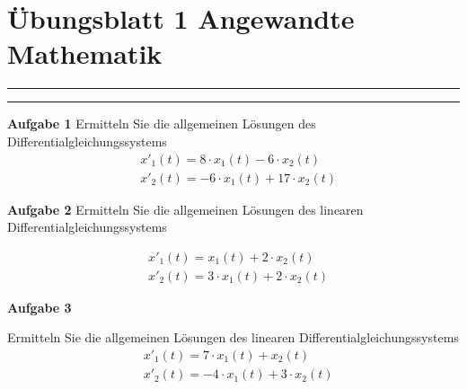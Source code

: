 \documentclass[a4paper,13pt]{scrartcl}
\begin{document}
\section*{\large  Übungsblatt 1 \hfill Angewandte Mathematik }
\hrule
\hrule
\vspace{4mm}

{\bf Aufgabe 1}
Ermitteln Sie die allgemeinen Lösungen  des  Differentialgleichungssystems
\begin{align*}
& x'_1(t) = 8 \cdot x_1(t) -6 \cdot x_2(t) \\
& x'_2(t) = -6 \cdot x_1(t) +17 \cdot x_2(t)
\end{align*}
\vspace{8mm}


{\bf Aufgabe 2}
Ermitteln Sie die allgemeinen Lösungen des linearen Differentialgleichungssystems

\begin{align*}
& x'_1(t) =  x_1(t) + 2 \cdot x_2(t) \\
& x'_2(t) =  3 \cdot x_1(t) +  2 \cdot x_2(t)
\end{align*}
\vspace{8mm}

\vspace{8mm}

{\bf Aufgabe 3}

Ermitteln Sie die allgemeinen Lösungen des  linearen Differentialgleichungssystems
\begin{align*}
& x'_1(t) =  7 \cdot x_1(t)  + x_2(t) \\
& x'_2(t) = -4 \cdot x_1(t) + 3 \cdot x_2(t)
\end{align*}
\end{document}
